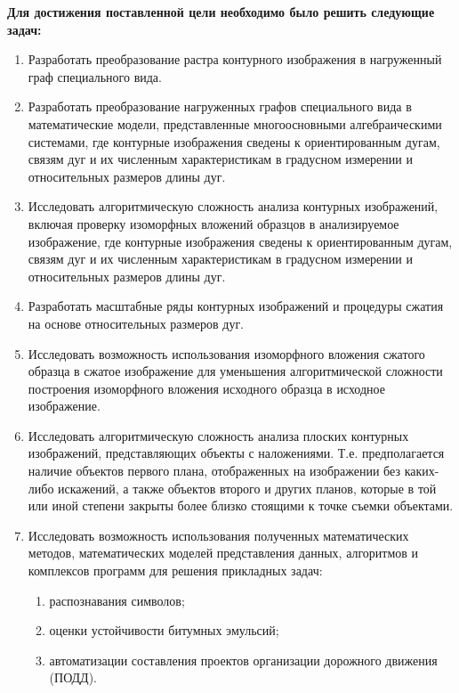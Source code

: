 \noindent
\textbf{Для достижения поставленной цели необходимо было решить следующие задач: }
\begin{enumerate}
\item Разработать преобразование растра контурного изображения в нагруженный граф специального вида.
\item Разработать преобразование нагруженных графов специального вида в математические модели, представленные многоосновными алгебраическими системами, где контурные изображения сведены к ориентированным дугам, связям дуг и их численным характеристикам в градусном измерении и  относительных размеров  длины дуг.
\item Исследовать алгоритмическую сложность  анализа контурных изображений, включая проверку изоморфных вложений образцов в анализируемое изображение, где контурные изображения сведены к ориентированным дугам, связям дуг и их численным характеристикам в градусном измерении и  относительных размеров  длины дуг.
\item Разработать  масштабные ряды контурных изображений и процедуры сжатия на  основе относительных размеров дуг.
\item Исследовать возможность использования  изоморфного вложения сжатого образца в сжатое изображение для уменьшения алгоритмической сложности построения  изоморфного вложения исходного образца в исходное изображение.
\item Исследовать алгоритмическую сложность  анализа плоских контурных изображений, представляющих объекты с наложениями. Т.е. предполагается наличие объектов первого плана, отображенных на изображении без каких-либо искажений,  а также объектов второго и других планов, которые в той или иной степени закрыты более близко стоящими к точке съемки объектами.
\item Исследовать возможность использования полученных математических методов, математических моделей представления данных, алгоритмов и комплексов программ для решения прикладных задач:
\begin{enumerate}
\item распознавания символов;
\item  оценки устойчивости битумных эмульсий; 
\item автоматизации составления проектов организации дорожного движения (ПОДД). 
\end{enumerate}

\end{enumerate}
 

